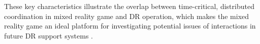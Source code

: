 These key characteristics illustrate the overlap between time-critical, distributed coordination in mixed reality game and DR operation, which makes the mixed reality game an ideal platform for investigating potential issues of interactions in future DR support systems \cite{Fischer2012}.\\








